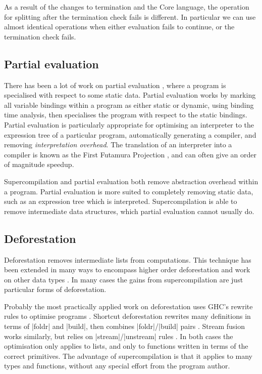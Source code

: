 \documentclass[draft]{sigplanconf}
\begin{document}
As a result of the changes to termination and the Core language, the operation for splitting after the termination check fails is different. In particular we can use almost identical operations when either evaluation fails to continue, or the termination check fails.

\subsection{Partial evaluation}

There has been a lot of work on partial evaluation \cite{jones:partial_evaluation}, where a program is specialised with respect to some static data. Partial evaluation works by marking all variable bindings within a program as either static or dynamic, using binding time analysis, then specialises the program with respect to the static bindings. Partial evaluation is particularly appropriate for optimising an interpreter to the expression tree of a particular program, automatically generating a compiler, and removing \textit{interpretation overhead}. The translation of an interpreter into a compiler is known as the First Futamura Projection \cite{futanama:projections}, and can often give an order of magnitude speedup.

Supercompilation and partial evaluation both remove abstraction overhead within a program. Partial evaluation is more suited to completely removing static data, such as an expression tree which is interpreted. Supercompilation is able to remove intermediate data structures, which partial evaluation cannot usually do.

\subsection{Deforestation}

Deforestation \cite{wadler:deforestation} removes intermediate lists from computations. This technique has been extended in many ways to encompass higher order deforestation \cite{marlow:higher_order_deforestation} and work on other data types \cite{coutts:string_fusion}. In many cases the gains from supercompilation are just particular forms of deforestation.

Probably the most practically applied work on deforestation uses GHC's rewrite rules to optimise programs \cite{spj:rules}. Shortcut deforestation rewrites many definitions in terms of |foldr| and |build|, then combines |foldr|/|build| pairs \cite{gill:shortcut_deforestation}. Stream fusion works similarly, but relies on |stream|/|unstream| rules \cite{coutts:stream_fusion}. In both cases the optimisation only applies to lists, and only to functions written in terms of the correct primitives. The advantage of supercompilation is that it applies to many types and functions, without any special effort from the program author.
\end{document}
